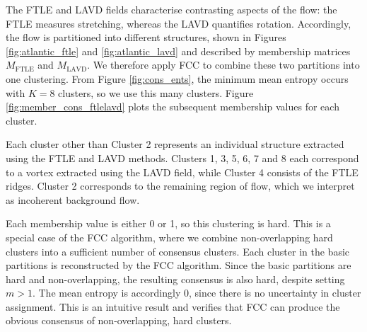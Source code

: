 \documentclass[a4paper, fontsize=12pt]{article}
\begin{document}
The FTLE and LAVD fields characterise contrasting aspects of the flow: the FTLE measures stretching, whereas the LAVD quantifies rotation. Accordingly, the flow is partitioned into different structures, shown in Figures \ref{fig:atlantic_ftle} and \ref{fig:atlantic_lavd} and described by membership matrices \(M_{\text{FTLE}}\) and \(M_{\text{LAVD}}\). We therefore apply FCC to combine these two partitions into one clustering. From Figure \ref{fig:cons_ents}, the minimum mean entropy occurs with \(K = 8\) clusters, so we use this many clusters. Figure \ref{fig:member_cons_ftlelavd} plots the subsequent membership values for each cluster.

Each cluster other than Cluster 2 represents an individual structure extracted using the FTLE and LAVD methods. Clusters  1, 3, 5, 6, 7 and 8 each correspond to a vortex extracted using the LAVD field, while Cluster 4 consists of the FTLE ridges. Cluster 2 corresponds to the remaining region of flow, which we interpret as incoherent background flow.

Each membership value is either 0 or 1, so this clustering is hard. This is a special case of the FCC algorithm, where we combine non-overlapping hard clusters into a sufficient number of consensus clusters. Each cluster in the basic partitions is reconstructed by the FCC algorithm. Since the basic partitions are hard and non-overlapping, the resulting consensus is also hard, despite setting \(m > 1\). The mean entropy is accordingly 0, since there is no uncertainty in cluster assignment. This is an intuitive result and verifies that FCC can produce the obvious consensus of non-overlapping, hard clusters.
\end{document}
